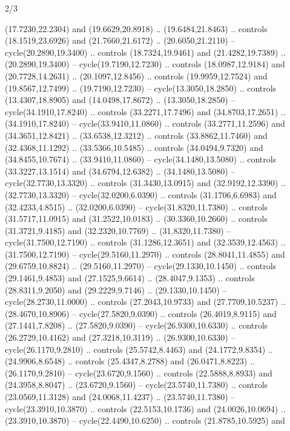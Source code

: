 \begin{flagdescription}{2/3}
\begin{scope}[yshift=\flagwidth,scale=\flagwidth/1241.93737]
\begin{scope}[y=-1mm, x=1mm,draw=gold,fill=blue,line join=miter,miter limit=4,line width=1.8\lw]
\begin{scope}[y=1mm, x=1mm, yscale=-1,shift={(573.68mm+\str,145.75)}]
\begin{scope}[scale=1.35,shift={(-9,-3)}]
\begin{scope}[scale=0.55]
\begin{scope}[scale=1.333]
    (17.7230,22.2304) and (19.6629,20.8918) .. (19.6484,21.8463) .. controls
    (18.1519,23.6926) and (21.7660,21.6172) .. (20.6050,21.2110) --
    cycle(20.2890,19.3400) .. controls (18.7324,19.9461) and (21.4282,19.7389) ..
    (20.2890,19.3400) -- cycle(19.7190,12.7230) .. controls (18.0987,12.9184) and
    (20.7728,14.2631) .. (20.1097,12.8456) .. controls (19.9959,12.7524) and
    (19.8567,12.7499) .. (19.7190,12.7230) -- cycle(13.3050,18.2850) .. controls
    (13.4307,18.8905) and (14.0498,17.8672) .. (13.3050,18.2850) --
    cycle(34.1910,17.8240) .. controls (33.2271,17.7496) and (34.8703,17.2651) ..
    (34.1910,17.8240) -- cycle(33.9410,11.0860) .. controls (33.2771,11.2596) and
    (34.3651,12.8421) .. (33.6538,12.3212) .. controls (33.8862,11.7460) and
    (32.4368,11.1292) .. (33.5366,10.5485) .. controls (34.0494,9.7320) and
    (34.8455,10.7674) .. (33.9410,11.0860) -- cycle(34.1480,13.5080) .. controls
    (33.3227,13.1514) and (34.6794,12.6382) .. (34.1480,13.5080) --
    cycle(32.7730,13.3320) .. controls (31.3430,13.0915) and (32.9192,12.3390) ..
    (32.7730,13.3320) -- cycle(32.0200,6.0390) .. controls (31.1706,6.6983) and
    (32.4233,4.8515) .. (32.0200,6.0390) -- cycle(31.8320,11.7380) .. controls
    (31.5717,11.0915) and (31.2522,10.0183) .. (30.3360,10.2660) .. controls
    (31.3721,9.4185) and (32.2320,10.7769) .. (31.8320,11.7380) --
    cycle(31.7500,12.7190) .. controls (31.1286,12.3651) and (32.3539,12.4563) ..
    (31.7500,12.7190) -- cycle(29.5160,11.2970) .. controls (28.8041,11.4855) and
    (29.6759,10.8824) .. (29.5160,11.2970) -- cycle(29.1330,10.1450) .. controls
    (29.1461,9.4853) and (27.1525,9.6614) .. (28.4047,9.1353) .. controls
    (28.8311,9.2050) and (29.2229,9.7146) .. (29.1330,10.1450) --
    cycle(28.2730,11.0000) .. controls (27.2043,10.9733) and (27.7709,10.5237) ..
    (28.4670,10.8906) -- cycle(27.5820,9.0390) .. controls (26.4019,8.9115) and
    (27.1441,7.8208) .. (27.5820,9.0390) -- cycle(26.9300,10.6330) .. controls
    (26.2729,10.4162) and (27.3218,10.3119) .. (26.9300,10.6330) --
    cycle(26.1170,9.2810) .. controls (25.5742,8.4463) and (24.1772,9.8354) ..
    (24.9906,8.6548) .. controls (25.4347,8.2788) and (26.0471,8.8223) ..
    (26.1170,9.2810) -- cycle(23.6720,9.1560) .. controls (22.5888,8.8933) and
    (24.3958,8.8047) .. (23.6720,9.1560) -- cycle(23.5740,11.7380) .. controls
    (23.0569,11.3128) and (24.0068,11.4237) .. (23.5740,11.7380) --
    cycle(23.3910,10.3870) .. controls (22.5153,10.1736) and (24.0026,10.0694) ..
    (23.3910,10.3870) -- cycle(22.4490,10.6250) .. controls (21.8785,10.5925) and

\end{scope}
\end{scope}
\end{scope}
\end{scope}
\end{scope}
\end{scope}
\end{flagdescription}
